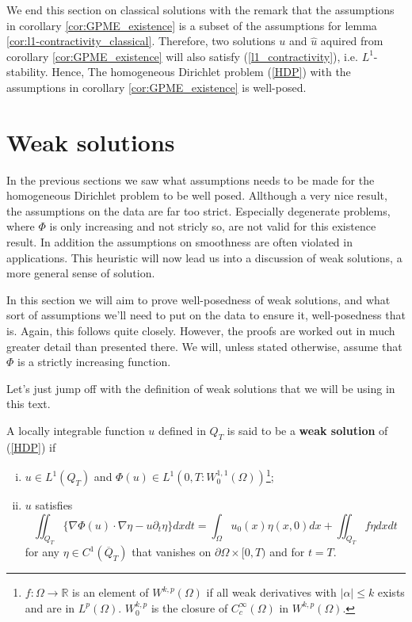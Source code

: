 \documentclass[11pt, a4paper]{article}
\begin{document}
\setcounter{rem}{0}
\begin{rem}
We end this section on classical solutions with the remark that the assumptions in corollary \ref{cor:GPME_existence} is a subset of the assumptions for lemma \ref{cor:l1-contractivity_classical}. Therefore, two solutions $u$ and $\hat{u}$ aquired from corollary \ref{cor:GPME_existence} will also satisfy (\ref{l1_contractivity}), i.e. $L^1$-stability. Hence, The homogeneous Dirichlet problem (\ref{HDP}) with the assumptions in corollary \ref{cor:GPME_existence} is well-posed.
\end{rem}


\newpage
\section{Weak solutions}
In the previous sections we saw what assumptions needs to be made for the homogeneous Dirichlet problem to be well posed. Allthough a very nice result, the assumptions on the data are far too strict. Especially degenerate problems, where $\Phi$ is only increasing and not stricly so, are not valid for this existence result. In addition the assumptions on smoothness are often violated in applications. This heuristic will now lead us into a discussion of weak solutions, a more general sense of solution. 

In this section we will aim to prove well-posedness of weak solutions, and what sort of assumptions we'll need to put on the data to ensure it, well-posedness that is. Again, this follows \citep[Ch. 5]{vazquez2007porous} quite closely. However, the proofs are worked out in much greater detail than presented there. We will, unless stated otherwise, assume that $\Phi$ is a strictly increasing function.

Let's just jump off with the definition of weak solutions that we will be using in this text.
\begin{mydef}
A locally integrable function $u$ defined in $Q_T$ is said to be a \textbf{weak solution} of (\ref{HDP}) if
\begin{enumerate}[i)]
	\item $u \in L^1(Q_T)$ and $\Phi(u) \in L^1(0,T : W_0^{1,1}(\Omega))$\footnote{$f:\Omega \to \mathbb{R}$ is an element of $W^{k,p}(\Omega)$ if all weak derivatives with $|\alpha| \leq k$ exists and are in $L^p(\Omega)$. $W_0^{k,p}$ is the closure of $C^\infty_c(\Omega)$ in $W^{k,p}(\Omega)$.};
	\item $u$ satisfies
		\begin{equation}
		\label{weak}
		\iint_{Q_T} \{\nabla\Phi(u)\cdot \nabla\eta - u\partial_t \eta \}dxdt = \int_\Omega u_0(x)\eta(x,0)dx + \iint_{Q_T}f\eta dxdt
		\end{equation}
for any $\eta \in C^1(\overline{Q}_T)$ that vanishes on $\partial \Omega \times [0,T)$ and for $t=T$.
\end{enumerate}
\end{mydef}
\end{document}

